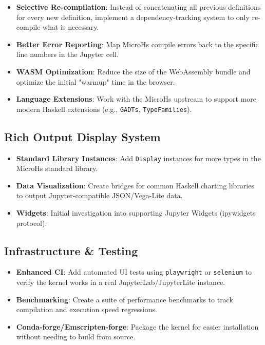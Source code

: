 \documentclass[11pt]{article}
\begin{document}
\begin{itemize}
\item [ ] \textbf{Selective Re-compilation}: Instead of concatenating all previous definitions for every new definition, implement a dependency-tracking system to only re-compile what is necessary.
\item [ ] \textbf{Better Error Reporting}: Map MicroHs compile errors back to the specific line numbers in the Jupyter cell.
\item [ ] \textbf{WASM Optimization}: Reduce the size of the WebAssembly bundle and optimize the initial "warmup" time in the browser.
\item [x] \textbf{Language Extensions}: Work with the MicroHs upstream to support more modern Haskell extensions (e.g., \texttt{GADTs}, \texttt{TypeFamilies}).
\end{itemize}


\subsection{Rich Output Display System}


\begin{itemize}
\item [ ] \textbf{Standard Library Instances}: Add \texttt{Display} instances for more types in the MicroHs standard library.
\item [ ] \textbf{Data Visualization}: Create bridges for common Haskell charting libraries to output Jupyter-compatible JSON/Vega-Lite data.
\item [ ] \textbf{Widgets}: Initial investigation into supporting Jupyter Widgets (ipywidgets protocol).
\end{itemize}


\subsection{Infrastructure \& Testing}


\begin{itemize}
\item [ ] \textbf{Enhanced CI}: Add automated UI tests using \texttt{playwright} or \texttt{selenium} to verify the kernel works in a real JupyterLab/JupyterLite instance.
\item [ ] \textbf{Benchmarking}: Create a suite of performance benchmarks to track compilation and execution speed regressions.
\item [ ] \textbf{Conda-forge/Emscripten-forge}: Package the kernel for easier installation without needing to build from source.
\end{itemize}
\end{document}
